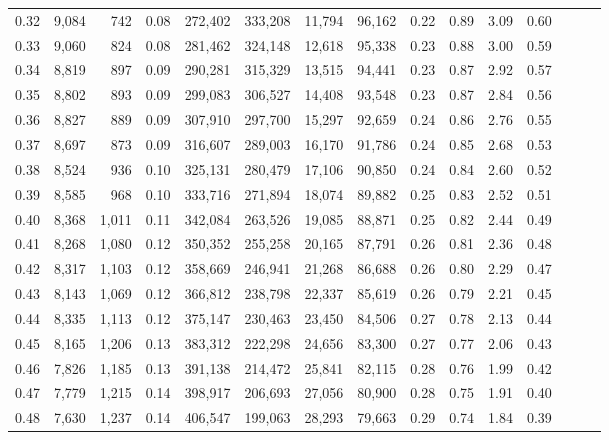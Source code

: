 \begin{tabular}{rrrrrrrrrrrrrrr}
0.32 &  9,084 &    742 &  0.08 &  272,402 &  333,208 &   11,794 &   96,162 &  0.22 &  0.89 &  3.09 &      0.60 \\
0.33 &  9,060 &    824 &  0.08 &  281,462 &  324,148 &   12,618 &   95,338 &  0.23 &  0.88 &  3.00 &      0.59 \\
0.34 &  8,819 &    897 &  0.09 &  290,281 &  315,329 &   13,515 &   94,441 &  0.23 &  0.87 &  2.92 &      0.57 \\
0.35 &  8,802 &    893 &  0.09 &  299,083 &  306,527 &   14,408 &   93,548 &  0.23 &  0.87 &  2.84 &      0.56 \\
0.36 &  8,827 &    889 &  0.09 &  307,910 &  297,700 &   15,297 &   92,659 &  0.24 &  0.86 &  2.76 &      0.55 \\
0.37 &  8,697 &    873 &  0.09 &  316,607 &  289,003 &   16,170 &   91,786 &  0.24 &  0.85 &  2.68 &      0.53 \\
0.38 &  8,524 &    936 &  0.10 &  325,131 &  280,479 &   17,106 &   90,850 &  0.24 &  0.84 &  2.60 &      0.52 \\
0.39 &  8,585 &    968 &  0.10 &  333,716 &  271,894 &   18,074 &   89,882 &  0.25 &  0.83 &  2.52 &      0.51 \\
0.40 &  8,368 &  1,011 &  0.11 &  342,084 &  263,526 &   19,085 &   88,871 &  0.25 &  0.82 &  2.44 &      0.49 \\
0.41 &  8,268 &  1,080 &  0.12 &  350,352 &  255,258 &   20,165 &   87,791 &  0.26 &  0.81 &  2.36 &      0.48 \\
0.42 &  8,317 &  1,103 &  0.12 &  358,669 &  246,941 &   21,268 &   86,688 &  0.26 &  0.80 &  2.29 &      0.47 \\
0.43 &  8,143 &  1,069 &  0.12 &  366,812 &  238,798 &   22,337 &   85,619 &  0.26 &  0.79 &  2.21 &      0.45 \\
0.44 &  8,335 &  1,113 &  0.12 &  375,147 &  230,463 &   23,450 &   84,506 &  0.27 &  0.78 &  2.13 &      0.44 \\
0.45 &  8,165 &  1,206 &  0.13 &  383,312 &  222,298 &   24,656 &   83,300 &  0.27 &  0.77 &  2.06 &      0.43 \\
0.46 &  7,826 &  1,185 &  0.13 &  391,138 &  214,472 &   25,841 &   82,115 &  0.28 &  0.76 &  1.99 &      0.42 \\
0.47 &  7,779 &  1,215 &  0.14 &  398,917 &  206,693 &   27,056 &   80,900 &  0.28 &  0.75 &  1.91 &      0.40 \\
0.48 &  7,630 &  1,237 &  0.14 &  406,547 &  199,063 &   28,293 &   79,663 &  0.29 &  0.74 &  1.84 &      0.39 \\

\end{tabular}
